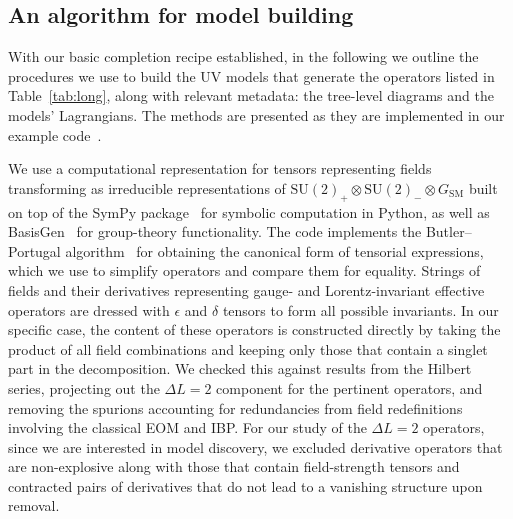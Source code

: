 \subsection{An algorithm for model building}
\label{sec:algorithm}

With our basic completion recipe established, in the following we outline the
procedures we use to build the UV models that generate the operators listed in
Table~\ref{tab:long}, along with relevant metadata: the tree-level diagrams and
the models' Lagrangians. The methods are presented as they are implemented in
our example code~\cite{neutrinomass2020}.

We use a computational representation for tensors representing fields
transforming as irreducible representations of
$\mathrm{SU}(2)_{+} \otimes \mathrm{SU}(2)_{-} \otimes G_{\text{SM}}$ built on
top of the \textsf{SymPy} package~\cite{10.7717/peerj-cs.103} for symbolic
computation in \textsf{Python}, as well as
\textsf{BasisGen}~\cite{Criado:2019ugp} for group-theory functionality. The code
implements the Butler--Portugal algorithm~\cite{butler1991, MANSSUR_2002} for
obtaining the canonical form of tensorial expressions, which we use to simplify
operators and compare them for equality. Strings of fields and their derivatives
representing gauge- and Lorentz-invariant effective operators are dressed with
$\epsilon$ and $\delta$ tensors to form all possible invariants. In our specific
case, the content of these operators is constructed directly by taking the
product of all field combinations and keeping only those that contain a singlet
part in the decomposition. We checked this against results from the Hilbert
series, projecting out the $\Delta L = 2$ component for the pertinent operators,
and removing the spurions accounting for redundancies from field redefinitions
involving the classical EOM and IBP. For our study of the $\Delta L = 2$
operators, since we are interested in model discovery, we excluded derivative
operators that are non-explosive along with those that contain field-strength
tensors and contracted pairs of derivatives that do not lead to a vanishing
structure upon removal.

